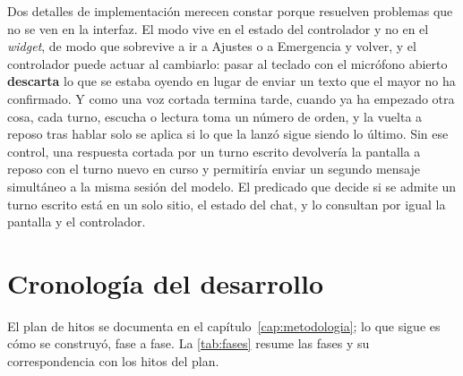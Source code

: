 Dos detalles de implementación merecen constar porque resuelven problemas que no se ven en la interfaz. El
modo vive en el estado del controlador y no en el \emph{widget}, de modo que sobrevive a ir a Ajustes o a
Emergencia y volver, y el controlador puede actuar al cambiarlo: pasar al teclado con el micrófono abierto
\textbf{descarta} lo que se estaba oyendo en lugar de enviar un texto que el mayor no ha confirmado. Y como
una voz cortada termina tarde, cuando ya ha empezado otra cosa, cada turno, escucha o lectura toma un número
de orden, y la vuelta a reposo tras hablar solo se aplica si lo que la lanzó sigue siendo lo último. Sin ese
control, una respuesta cortada por un turno escrito devolvería la pantalla a reposo con el turno nuevo en
curso y permitiría enviar un segundo mensaje simultáneo a la misma sesión del modelo. El predicado que decide
si se admite un turno escrito está en un solo sitio, el estado del chat, y lo consultan por igual la
pantalla y el controlador.

\section{Cronología del desarrollo}
\label{sec:cronologia}

El plan de hitos se documenta en el capítulo~\ref{cap:metodologia}; lo que sigue es cómo se construyó, fase
a fase. La \autoref{tab:fases} resume las fases y su correspondencia con los hitos del plan.


